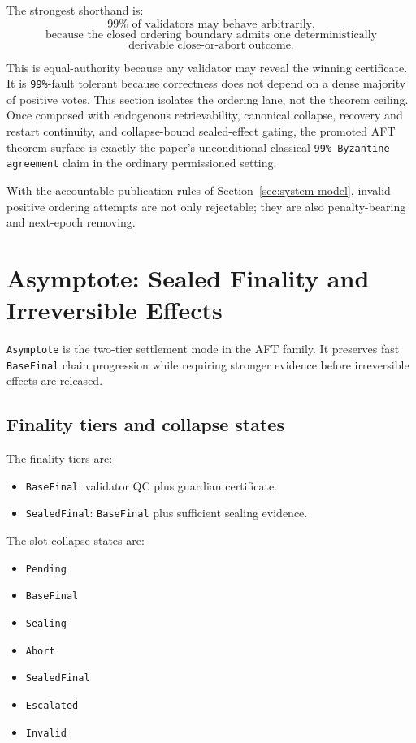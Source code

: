 \documentclass[11pt]{article}
\newcommand{\AFT}{\textsc{AFT}}
\newcommand{\code}[1]{\texttt{#1}}
\begin{document}
The strongest shorthand is:
\[
99\% \text{ of validators may behave arbitrarily,}
\]
\[
\text{because the closed ordering boundary admits one deterministically}
\]
\[
\text{derivable close-or-abort outcome.}
\]

This is equal-authority because any validator may reveal the winning
certificate. It is \code{99\%}-fault tolerant because correctness does not
depend on a dense majority of positive votes. This section isolates the
ordering lane, not the theorem ceiling. Once composed with endogenous
retrievability, canonical collapse, recovery and restart continuity, and
collapse-bound sealed-effect gating, the promoted \AFT{} theorem surface is
exactly the paper's unconditional classical \code{99\% Byzantine agreement}
claim in the ordinary permissioned setting.

With the accountable publication rules of
Section~\ref{sec:system-model}, invalid positive ordering attempts are not only
rejectable; they are also penalty-bearing and next-epoch removing.

\section{Asymptote: Sealed Finality and Irreversible Effects}

\code{Asymptote} is the two-tier settlement mode in the \AFT{} family. It
preserves fast \code{BaseFinal} chain progression while requiring stronger
evidence before irreversible effects are released.

\subsection{Finality tiers and collapse states}

The finality tiers are:

\begin{itemize}[leftmargin=1.5em]
\item \code{BaseFinal}: validator QC plus guardian certificate.
\item \code{SealedFinal}: \code{BaseFinal} plus sufficient sealing evidence.
\end{itemize}

The slot collapse states are:

\begin{itemize}[leftmargin=1.5em]
\item \code{Pending}
\item \code{BaseFinal}
\item \code{Sealing}
\item \code{Abort}
\item \code{SealedFinal}
\item \code{Escalated}
\item \code{Invalid}
\end{itemize}
\end{document}
